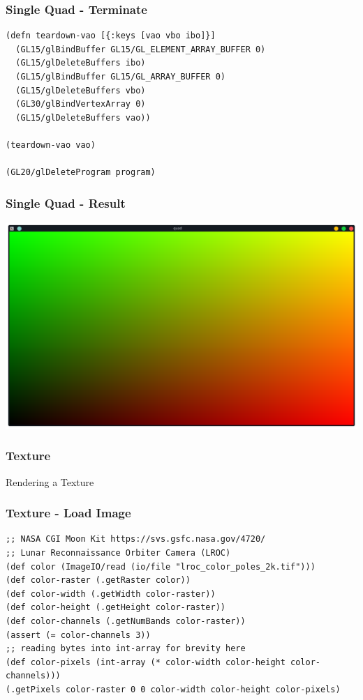 \documentclass[aspectratio=169,11pt,xcolor=dvipsnames]{beamer}
\begin{document}
\begin{frame}[fragile]
  \frametitle{Single Quad {-} Terminate}
  \begin{verbatim}
(defn teardown-vao [{:keys [vao vbo ibo]}]
  (GL15/glBindBuffer GL15/GL_ELEMENT_ARRAY_BUFFER 0)
  (GL15/glDeleteBuffers ibo)
  (GL15/glBindBuffer GL15/GL_ARRAY_BUFFER 0)
  (GL15/glDeleteBuffers vbo)
  (GL30/glBindVertexArray 0)
  (GL15/glDeleteBuffers vao))

(teardown-vao vao)

(GL20/glDeleteProgram program)
  \end{verbatim}
\end{frame}

\begin{frame}
  \frametitle{Single Quad {-} Result}
  \begin{center}
    \includegraphics[width=.8\textwidth]{quad}
  \end{center}
\end{frame}

\begin{frame}
  \frametitle{Texture}
  \begin{center}
    \begin{huge}
      Rendering a Texture
    \end{huge}
  \end{center}
\end{frame}

\begin{frame}[fragile]
  \frametitle{Texture {-} Load Image}
  \begin{verbatim}
;; NASA CGI Moon Kit https://svs.gsfc.nasa.gov/4720/
;; Lunar Reconnaissance Orbiter Camera (LROC)
(def color (ImageIO/read (io/file "lroc_color_poles_2k.tif")))
(def color-raster (.getRaster color))
(def color-width (.getWidth color-raster))
(def color-height (.getHeight color-raster))
(def color-channels (.getNumBands color-raster))
(assert (= color-channels 3))
;; reading bytes into int-array for brevity here
(def color-pixels (int-array (* color-width color-height color-channels)))
(.getPixels color-raster 0 0 color-width color-height color-pixels)
  \end{verbatim}
\end{frame}
\end{document}
